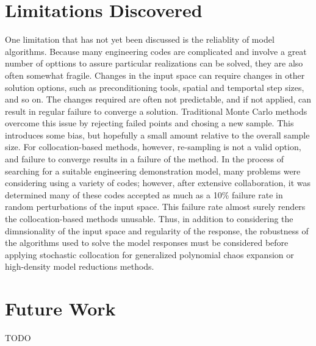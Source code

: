 \section{Limitations Discovered}
One limitation that has not yet been discussed is the reliablity of model algorithms.  Because many engineering codes are
complicated and involve a great number of opttions to assure particular realizations can be solved, they are also often
somewhat fragile.  Changes in the input space can require changes in other solution options, such as preconditioning tools,
spatial and temportal step sizes, and so on.  The changes required are often not predictable, and if not applied, can result
in regular failure to converge a solution.  Traditional Monte Carlo methods overcome this issue by rejecting failed points and
chosing a new sample.  This introduces some bias, but hopefully a small amount relative to the overall sample size.  For
collocation-based methods, however, re-sampling is not a valid option, and failure to converge results in a failure of the method.
In the process of searching for a suitable engineering demonstration model, many problems were considering using a variety of
codes; however, after extensive collaboration, it was determined many of these codes accepted as much as a 10\% failure rate
in random perturbations of the input space.  This failure rate almost surely renders the collocation-based methods
unusable.  Thus, in addition to considering the dimnsionality of the input space and regularity of the response, the
robustness of the algorithms used to solve the model responses must be considered before applying stochastic collocation for
generalized polynomial chaos expansion or high-density model reductions methods.

\section{Future Work}\label{sec:future}
TODO
